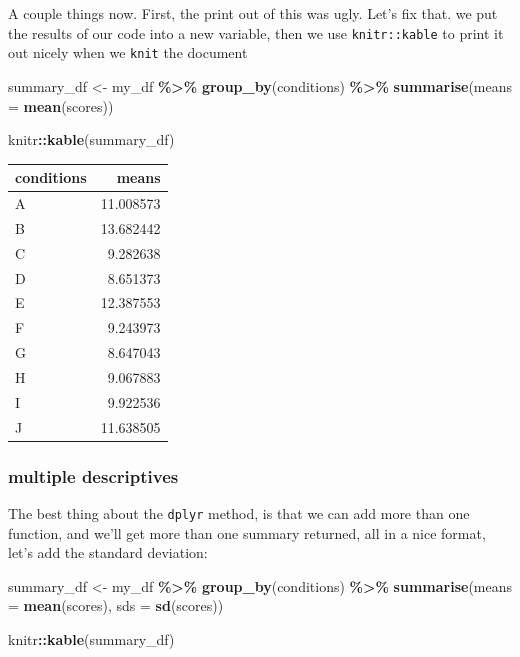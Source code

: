 \documentclass[
]{book}
\newenvironment{Shaded}{\begin{snugshade}}{\end{snugshade}}
\newcommand{\AttributeTok}[1]{\textcolor[rgb]{0.13,0.29,0.53}{#1}}
\newcommand{\FunctionTok}[1]{\textcolor[rgb]{0.13,0.29,0.53}{\textbf{#1}}}
\newcommand{\NormalTok}[1]{#1}
\newcommand{\OtherTok}[1]{\textcolor[rgb]{0.56,0.35,0.01}{#1}}
\newcommand{\SpecialCharTok}[1]{\textcolor[rgb]{0.81,0.36,0.00}{\textbf{#1}}}
\begin{document}
A couple things now. First, the print out of this was ugly. Let's fix that. we put the results of our code into a new variable, then we use \texttt{knitr::kable} to print it out nicely when we \texttt{knit} the document

\begin{Shaded}
\begin{Highlighting}[]
\NormalTok{summary\_df }\OtherTok{\textless{}{-}}\NormalTok{ my\_df }\SpecialCharTok{\%\textgreater{}\%}
               \FunctionTok{group\_by}\NormalTok{(conditions) }\SpecialCharTok{\%\textgreater{}\%}
               \FunctionTok{summarise}\NormalTok{(}\AttributeTok{means =} \FunctionTok{mean}\NormalTok{(scores))}

\NormalTok{knitr}\SpecialCharTok{::}\FunctionTok{kable}\NormalTok{(summary\_df)}
\end{Highlighting}
\end{Shaded}

\begin{tabular}{l|r}
\hline
conditions & means\\
\hline
A & 11.008573\\
\hline
B & 13.682442\\
\hline
C & 9.282638\\
\hline
D & 8.651373\\
\hline
E & 12.387553\\
\hline
F & 9.243973\\
\hline
G & 8.647043\\
\hline
H & 9.067883\\
\hline
I & 9.922536\\
\hline
J & 11.638505\\
\hline
\end{tabular}

\hypertarget{multiple-descriptives}{%
\subsubsection{multiple descriptives}\label{multiple-descriptives}}

The best thing about the \texttt{dplyr} method, is that we can add more than one function, and we'll get more than one summary returned, all in a nice format, let's add the standard deviation:

\begin{Shaded}
\begin{Highlighting}[]
\NormalTok{summary\_df }\OtherTok{\textless{}{-}}\NormalTok{ my\_df }\SpecialCharTok{\%\textgreater{}\%}
               \FunctionTok{group\_by}\NormalTok{(conditions) }\SpecialCharTok{\%\textgreater{}\%}
               \FunctionTok{summarise}\NormalTok{(}\AttributeTok{means =} \FunctionTok{mean}\NormalTok{(scores),}
                         \AttributeTok{sds =} \FunctionTok{sd}\NormalTok{(scores))}

\NormalTok{knitr}\SpecialCharTok{::}\FunctionTok{kable}\NormalTok{(summary\_df)}
\end{Highlighting}
\end{Shaded}
\end{document}
